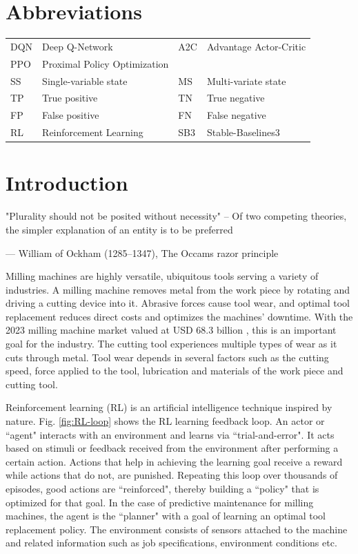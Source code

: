 \documentclass[a4paper, 12pt]{article}
\newcommand{\rowspace}[1]{\renewcommand{\arraystretch}{#1}}
\begin{document}
\section*{Abbreviations}

\begin{table}[!htbp]\centering
	\sffamily
	\rowspace{1.3}
	\begin{tabular}{L{1cm} L{4.5cm} L{1cm} L{4.5cm}}
		\toprule	
		
		DQN & Deep Q-Network & A2C & Advantage Actor-Critic\\
		PPO & Proximal Policy Optimization & & \\
		SS & Single-variable state & MS & Multi-variate state\\
		TP &True positive &TN &True negative\\
		FP &False positive &FN &False negative\\
		RL & Reinforcement Learning & SB3 & Stable-Baselines3\\

		\bottomrule
	\end{tabular}
	\label{tbl:abbrev}
\end{table}

\newpage
\section{Introduction}
\epigraph{"Plurality should not be posited without necessity" -- Of two competing theories, the simpler explanation of an entity is to be preferred}{--- \textup{William of Ockham (1285–1347)}, The Occams razor principle}

\noindent Milling machines are highly versatile, ubiquitous tools serving a variety of industries. A milling machine removes metal from the work piece by rotating and driving a cutting device into it. Abrasive forces cause tool wear, and optimal tool replacement reduces direct costs and optimizes the machines' downtime. With the 2023 milling machine market valued at USD 68.3 billion \citep{milling-market}, this is an important goal for the industry. The cutting tool experiences multiple types of wear as it cuts through metal. Tool wear depends in several factors such as the cutting speed, force applied to the tool, lubrication and materials of the work piece and cutting tool. 

Reinforcement learning (RL) is an artificial intelligence technique inspired by nature. Fig. \ref{fig:RL-loop} \citep{barto2018} shows the RL learning feedback loop. An actor or ``agent" interacts with an environment and learns via ``trial-and-error". It acts based on stimuli or feedback received from the environment after performing a certain action. Actions that help in achieving the learning goal receive a reward while actions that do not, are punished. Repeating this loop over thousands of episodes, good actions are ``reinforced", thereby building a ``policy" that is optimized for that goal. In the case of predictive maintenance for milling machines, the agent is the ``planner" with a goal of learning an optimal tool replacement policy. The environment consists of sensors attached to the machine and related information such as job specifications, environment conditions etc.
\end{document}
